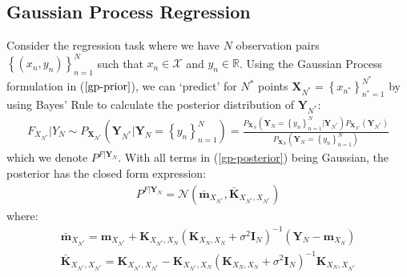 \documentclass[twoside,11pt]{article}
\begin{document}
\subsection{Gaussian Process Regression \cite{wild2023connections}}
Consider the regression task where we have $N$ observation pairs $\left\{(x_n, y_n)\right\}_{n=1}^N$ such that $x_n \in \mathcal{X}$ and $y_n \in \mathbb{R}$. Using the Gaussian Process formulation in ($\ref{gp-prior}$), we can `predict' for $N^*$ points $\mathbf{X}_{N^*} = \left\{ x_{n^*}\right\}_{n^*=1}^{N^*}$ by using Bayes' Rule to calculate the posterior distribution of $\mathbf{Y}_{N^*}$:
\begin{align}
    F_{X_{N^*}} \vert Y_N \sim P_{\mathbf{X}_{N^*}}(\mathbf{Y}_{N^*} | \mathbf{Y}_N= \left\{ y_n\right\}_{n=1}^N) = \frac{ P_{\mathbf{X}_N}(\mathbf{Y}_N=\left\{ y_n\right\}_{n=1}^N \vert \mathbf{Y}_{N^*})  P_{\mathbf{X}_{N^*}}(\mathbf{Y}_{N^*})}{ P_{\mathbf{X}_N}(\mathbf{Y}_N= \left\{ y_n\right\}_{n=1}^N)}
    \label{gp-posterior}
\end{align}
which we denote $P^{F \vert \mathbf{Y}_N}$. With all terms in (\ref{gp-posterior}) being Gaussian, the posterior has the closed form expression:
\begin{align}
    P^{F \vert \mathbf{Y}_N} =  \mathcal{N}(\bar{\mathbf{m}}_{X_{N^*}}, \bar{\mathbf{K}}_{X_{N^*}, X_{N^*}})
\end{align}
where:
\begin{align}
    \label{gp-posterior-mean}
    \bar{\mathbf{m}}_{X_{N^*}} = \mathbf{m}_{X_{N^*}} + \mathbf{K}_{X_{N^*}, X_N} \left( \mathbf{K}_{X_N, X_N} + \sigma^2 \mathbf{I}_N\right)^{-1} \left( \mathbf{Y}_N - \mathbf{m}_{X_N}\right)\\
    \label{gp-posterior-covariance}
    \bar{\mathbf{K}}_{X_{N^*}, X_{N^*}} = \mathbf{K}_{X_{N^*}, X_{N^*}} - \mathbf{K}_{X_{N^*}, X_N}\left( \mathbf{K}_{X_N, X_N} + \sigma^2 \mathbf{I}_N\right)^{-1}\mathbf{K}_{X_N, X_{N^*}}
\end{align}
\end{document}

